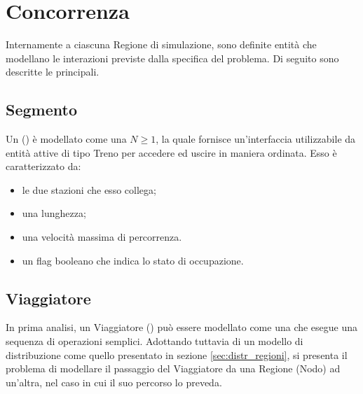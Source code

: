 \section{Concorrenza}

Internamente a ciascuna Regione di simulazione, sono definite entità che modellano le interazioni previste dalla specifica del problema. Di seguito sono descritte le principali.

	
	\subsection{Segmento}\label{subsec:segment_def}
	
	Un  () è modellato come una  $N\ge1$, la quale fornisce un'interfaccia utilizzabile da entità attive di tipo Treno per accedere ed uscire in maniera ordinata. Esso è caratterizzato da:
			\begin{itemize}
				\item le due stazioni che esso collega;
				\item una lunghezza;
				\item una velocità massima di percorrenza.
				\item un flag booleano  che indica lo stato di occupazione.
			\end{itemize}


	\subsection{Viaggiatore}\label{subsec:traveler_def}		
	
	In prima analisi, un Viaggiatore () può essere modellato come una  che esegue una sequenza di operazioni semplici. Adottando tuttavia di un modello di distribuzione come quello presentato in sezione \ref{sec:distr_regioni}, si presenta il problema di modellare il passaggio del Viaggiatore da una Regione (Nodo) ad un'altra, nel caso in cui il suo percorso lo preveda.
	
